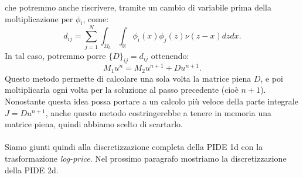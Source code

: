 \documentclass[a4paper,10pt]{report}
\theoremstyle{plain}
\theoremstyle{definition}
\theoremstyle{remark}
\begin{document}
che potremmo anche riscrivere, tramite un cambio di variabile prima della moltiplicazione per $\phi_i$, come: $$d_{ij}=\sum_{j=1}^N  \int_{\Omega_h} \int_{\mathbb{R}} \phi_i(x)\phi_j(z)\nu(z-x)dzdx.$$In tal caso, potremmo porre $\{D\}_{ij}=d_{ij}$ ottenendo:$$M_1u^n=M_2u^{n+1}+Du^{n+1}.$$Questo metodo permette di calcolare una sola volta la matrice piena $D$, e poi moltiplicarla ogni volta per la soluzione al passo precedente (cio\`e $n+1$). Nonostante questa idea possa portare a un calcolo pi\`u veloce della parte integrale $J=Du^{n+1}$, anche questo metodo costringerebbe a tenere in memoria una matrice piena, quindi abbiamo scelto di scartarlo.\\\\Siamo giunti quindi alla discretizzazione completa della PIDE 1d con la trasformazione \emph{log-price}. Nel prossimo paragrafo mostriamo la discretizzazione della PIDE 2d.
\end{document}
